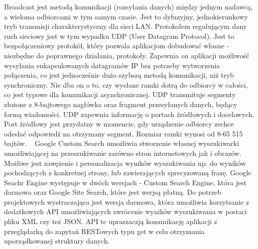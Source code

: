 \documentclass[twoside,a4paper]{book}
\begin{document}
Broadcast jest metodą komunikacji (rozsyłania danych) między jednym nadawcą, a wieloma odbiorcami w tym samym czasie. Jest to dyfuzyjny, jednokierunkowy tryb  transmisji charakterystyczny dla sieci LAN. Protokołem regulującym dany ruch sieciowy jest w tym wypadku UDP (User Datagram Protocol). Jest to bezpołączeniowy protokół, który pozwala aplikacjom dobudować własne - niezbędne do poprawnego działania, protokoły. 
Zapewnia on aplikacji możliwość wysyłania enkapsulowanych datagramów IP bez potrzeby wytworzenia połączenia, co jest jednocześnie dużo szybszą metodą komunikacji, niż tryb synchroniczny. Nie dba on o to, czy wysłane ramki dotrą do odbiorcy w całości, co jest typowe dla komunikacji asynchronicznej.
UDP transmituje segmenty złożone z 8-bajtowego nagłówka oraz fragment przesyłanych danych, będący formą wiadomości. 
UDP zapewnia informację o portach źródłowych i docelowych. 
Port źródłowy jest przydatny w momencie, gdy urządzenie odbiorcy zechce odesłać odpowiedź na otrzymany segment.
Rozmiar ramki wynosi od 8-65 515 bajtów. ~\cite{UDP}
\label{sec:customSearch}
Google Custom Search umożliwia stworzenie własnej wyszukiwarki umożliwiającej na przeszukiwanie zarówno stron internetowych jak i obrazów. Możliwe jest zawężenie i personalizacja wyników wyszukiwania np. do wyników pochodzących z konkretnej strony, lub zawierających sprecyzowaną frazę.  Google Seachr Engine występuje w dwóch wersjach - Custom Search Engine, która jest darmowa oraz Google Site Search, które jest werjsą płatną. Do potrzeb projektowych wystraczająca jest wersja darmowa, która umożliwia korzytsanie z dodatkowych API umożliwiających zwrócenie wyników wyszukiwania w postaci pliku XML czy też JSON. API te upraszaczją komunikację aplikacji z przeglądarką do zapytań RESTowych typu get w celu otrzymania uporządkowanej struktury danych. ~\cite{googleAPI}


 
\end{document}

